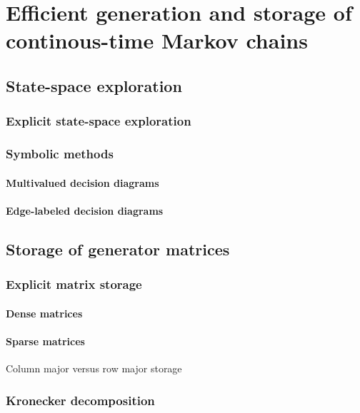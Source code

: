 \chapter{Efficient generation and storage of continous-time Markov chains}
\label{chap:generation_storage}

\section{State-space exploration}

\subsection{Explicit state-space exploration}

\subsection{Symbolic methods}

\subsubsection{Multivalued decision diagrams}

\subsubsection{Edge-labeled decision diagrams}

\section{Storage of generator matrices}

\subsection{Explicit matrix storage}

\subsubsection{Dense matrices}

\subsubsection{Sparse matrices}

Column major versus row major storage

\subsection{Kronecker decomposition}

